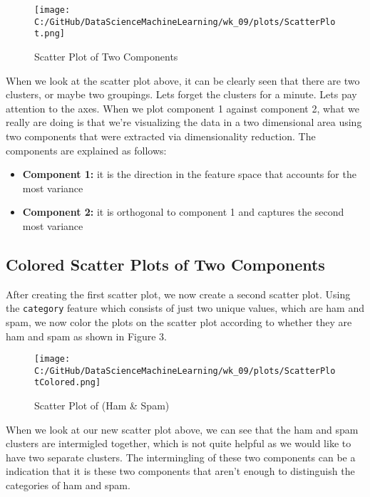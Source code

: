 \documentclass[a4paper, twocolumn]{article}
\begin{document}
\begin{figure}[H]
    \centering
    \texttt{[image: C:/GitHub/DataScienceMachineLearning/wk\_09/plots/ScatterPlot.png]}
    \caption{Scatter Plot of Two Components}
\end{figure}

\vspace{1em}

\noindent When we look at the scatter plot above, it can be clearly seen that there are two clusters, or maybe two groupings. Lets forget the clusters for a
minute. Lets pay attention to the axes. When we plot component 1 against component 2, what we really are doing is that we're visualizing the data in a two 
dimensional area using two components that were extracted via dimensionality reduction. The components are explained as follows:

\begin{itemize}
    \item \textbf{Component 1:} it is the direction in the feature space that accounts for the most variance 
    \item \textbf{Component 2:} it is orthogonal to component 1 and captures the second most variance
\end{itemize}

\subsection{Colored Scatter Plots of Two Components}
\noindent After creating the first scatter plot, we now create a second scatter plot. Using the \texttt{category} feature which consists of just two unique 
values, which are ham and spam, we now color the plots on the scatter plot according to whether they are ham and spam as shown in Figure 3.

\begin{figure}[H]
    \centering
    \texttt{[image: C:/GitHub/DataScienceMachineLearning/wk\_09/plots/ScatterPlotColored.png]}
    \caption{Scatter Plot of (Ham \& Spam)}
\end{figure}

\vspace{1em}

\noindent When we look at our new scatter plot above, we can see that the ham and spam clusters are intermigled together, which is not quite helpful as we 
would like to have two separate clusters. The intermingling of these two components can be a indication that it is these two components that aren't enough 
to distinguish the categories of ham and spam. 
\end{document}
